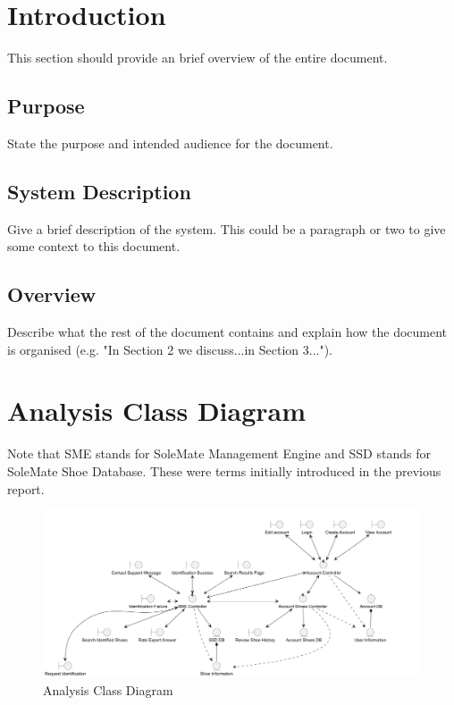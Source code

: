 \documentclass[]{article}
\begin{document}
\newpage
\section{Introduction}
\label{sec:introduction}

This section should provide an brief overview of the entire document.

\subsection{Purpose}
\label{sub:purpose}
State the purpose and intended audience for the document.

\subsection{System Description}
\label{sub:system_description}
Give a brief description of the system. This could be a paragraph or two to give some context to this document.


\subsection{Overview}
\label{sub:overview}
Describe what the rest of the document contains and explain how the document is organised (e.g. "In Section 2 we discuss...in Section 3...").



\section{Analysis Class Diagram}
\label{sec:analysis_class_diagram}
Note that SME stands for SoleMate Management Engine and SSD stands for SoleMate Shoe Database. These were terms initially introduced in the previous report.
\begin{figure}[h]
	\includegraphics[width = \textwidth]{analysisClassDiagram.png}
	\caption{Analysis Class Diagram}\label{Fig:Q1}
  \end{figure}
\end{document}
